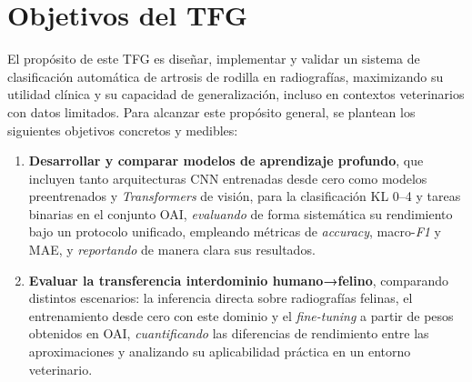 \documentclass[11pt,spanish,listoffigures,listoftables]{tfgetsinf}
\begin{document}
\section{Objetivos del TFG}
El propósito de este TFG es diseñar, implementar y validar un sistema de
clasificación automática de artrosis de rodilla en radiografías, maximizando su
utilidad clínica y su capacidad de generalización, incluso en contextos
veterinarios con datos limitados. Para alcanzar este propósito general, se
plantean los siguientes objetivos concretos y medibles:

\begin{enumerate}
	\item \textbf{Desarrollar y comparar modelos de aprendizaje profundo}, que incluyen tanto arquitecturas CNN entrenadas desde cero como modelos preentrenados y \textit{Transformers} de visión, para la clasificación KL 0--4 y tareas binarias en el conjunto OAI, \textit{evaluando} de forma sistemática su rendimiento bajo un protocolo unificado, empleando métricas de \textit{accuracy}, macro-\textit{F1} y MAE, y \textit{reportando} de manera clara sus resultados.
	\item \textbf{Evaluar la transferencia interdominio humano→felino}, comparando distintos escenarios: la inferencia directa sobre radiografías felinas, el entrenamiento desde cero con este dominio y el \textit{fine-tuning} a partir de pesos obtenidos en OAI, \textit{cuantificando} las diferencias de rendimiento entre las aproximaciones y analizando su aplicabilidad práctica en un entorno veterinario.
\end{enumerate}
\end{document}
